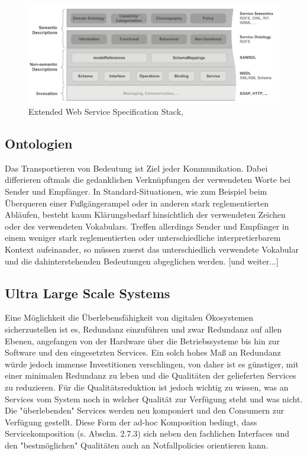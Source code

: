 \documentclass[10pt,a4paper]{article}
\begin{document}
\begin{figure}
\includegraphics[width=14cm]{Extended-Web-Service-Specification-Stack.pdf}
\caption{Extended Web Service Specification Stack, \cite{WSMOLITE}}
\end{figure}

\subsection{Ontologien}

Das Transportieren von Bedeutung ist Ziel jeder Kommunikation. Dabei
differieren oftmals die gedanklichen Verknüpfungen der verwendeten Worte bei
Sender und Empfänger. In Standard-Situationen, wie zum Beispiel beim
Überqueren einer Fußgängerampel oder in anderen stark reglementierten
Abläufen, besteht kaum Klärungsbedarf hinsichtlich der verwendeten Zeichen
oder des verwendeten Vokabulars. Treffen allerdings Sender und Empfänger in
einem weniger stark reglementierten oder unterschiedliche interpretierbarem
Kontext aufeinander, so müssen zuerst das unterschiedlich verwendete Vokabular
und die dahinterstehenden Bedeutungen abgeglichen werden. [und weiter...] \cite{sgthesis}

\subsection{Ultra Large Scale Systems}

Eine Möglichkeit die Überlebensfähigkeit von digitalen Ökosystemen sicherzustellen
ist es, Redundanz einzuführen und zwar Redundanz auf allen Ebenen, angefangen
von der Hardware über die Betriebssysteme bis hin zur Software und den
eingesetzten Services. Ein solch hohes Maß an Redundanz würde jedoch immense
Investitionen verschlingen, von daher ist es günstiger, mit einer minimalen Redundanz
zu leben und die Qualitäten der gelieferten Services zu reduzieren. Für die
Qualitätsreduktion ist jedoch wichtig zu wissen, was an Services vom System noch
in welcher Qualität zur Verfügung steht und was nicht. Die "überlebenden" Services
werden neu komponiert und den Consumern zur Verfügung gestellt. Diese Form der
ad-hoc Komposition bedingt, dass Servicekomposition (s. Abschn. 2.7.3) sich neben
den fachlichen Interfaces und den "bestmöglichen" Qualitäten auch an Notfallpolicies
orientieren kann. \cite{mkulss}
\end{document}
